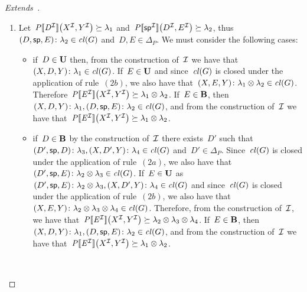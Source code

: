 \begin{proof}[Extends~\citep{MunozPerezGutierrez:2009aa}]
\begin{description}[nosep]
\begin{enumerate}[label=(\alph*),nosep]
    \item Let~$\mathit{{P[\![{D}^{\mathcal{I}}]\!]}}\!\left({X}^{\mathcal{I}}, {Y}^{\mathcal{I}}\right) \succeq \lambda_1$ and~$\mathit{{P[\![{\mathsf{sp}}^{\mathcal{I}}]\!]}}\!\left({D}^{\mathcal{I}}, {E}^{\mathcal{I}}\right)
      \succeq \lambda_2$, thus~$\mbox{$(D,\mathsf{sp},E)\colon\lambda_2$} \in \mathit{cl}\!\left(G\right)$ and~$D,E\in\Delta_P$.
      We must consider the following cases:
      \begin{itemize}[nosep]
      \item if~$D \in \mathbf{U}$ then, from the construction of~$\mathcal{I}$ we have that~$\mbox{$(X,D,Y)\colon\lambda_1$} \in
        \mathit{cl}\!\left(G\right)$.
        If~$E \in \mathbf{U}$ and since~$\mathit{cl}\!\left(G\right)$ is closed under the application of rule~$(2b)$, we also have
        that~$\mbox{$(X,E,Y)\colon\lambda_1 \otimes \lambda_2$} \in \mathit{cl}\!\left(G\right)$.
        Therefore~$\mathit{{P[\![{E}^{\mathcal{I}}]\!]}}\!\left({X}^{\mathcal{I}}, {Y}^{\mathcal{I}}\right) \succeq \lambda_1 \otimes \lambda_2$.
        If~$E \in \mathbf{B}$, then~$\mbox{$(X,D,Y)\colon\lambda_1$}, \mbox{$(D,\mathsf{sp},E)\colon\lambda_2$} \in \mathit{cl}\!\left(G\right)$,
        and from the construction of~$\mathcal{I}$ we have that~$\mathit{{P[\![{E}^{\mathcal{I}}]\!]}}\!\left({X}^{\mathcal{I}}, {Y}^{\mathcal{I}}\right) \succeq \lambda_1 \otimes
        \lambda_2$.
      \item if~$D \in \mathbf{B}$ by the construction of~$\mathcal{I}$ there exists~$D'$ such
        that~$\mbox{$(D',\mathsf{sp},D)\colon\lambda_3$}, \mbox{$(X,D',Y)\colon\lambda_4$} \in \mathit{cl}\!\left(G\right)$ and~$D' \in
        \Delta_{P}$.
        Since~$\mathit{cl}\!\left(G\right)$ is closed under the application of rule~$(2a)$, we also have
        that~$\mbox{$(D',\mathsf{sp},E)\colon\lambda_2 \otimes \lambda_3$} \in \mathit{cl}\!\left(G\right)$.
        If~$E \in \mathbf{U}$ as~$\mbox{$(D',\mathsf{sp},E)\colon\lambda_2 \otimes \lambda_3$}, \mbox{$(X,D',Y)\colon\lambda_4$}
        \in \mathit{cl}\!\left(G\right)$ and since~$\mathit{cl}\!\left(G\right)$ is closed under the application of rule~$(2b)$, we also have
        that~$\mbox{$(X,E,Y)\colon\lambda_2 \otimes \lambda_3 \otimes \lambda_4$} \in \mathit{cl}\!\left(G\right)$.
        Therefore, from the construction of~$\mathcal{I}$, we have that~$\mathit{{P[\![{E}^{\mathcal{I}}]\!]}}\!\left({X}^{\mathcal{I}}, {Y}^{\mathcal{I}}\right) \succeq \lambda_2
        \otimes \lambda_3 \otimes \lambda_4$.
        If~$E \in \mathbf{B}$, then~$\mbox{$(X,D,Y)\colon\lambda_1$}, \mbox{$(D,\mathsf{sp},E)\colon\lambda_2$} \in \mathit{cl}\!\left(G\right)$,
        and from the construction of~$\mathcal{I}$ we have that~$\mathit{{P[\![{E}^{\mathcal{I}}]\!]}}\!\left({X}^{\mathcal{I}}, {Y}^{\mathcal{I}}\right) \succeq \lambda_1 \otimes
        \lambda_2$.
      \end{itemize}
    \end{enumerate}
  \item[Subclass:]~ 
    \begin{enumerate}[label=(\alph*),nosep]

\end{enumerate}
\end{description}
\end{proof}
